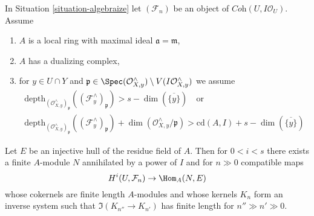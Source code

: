 \begin{lemma}
\label{lemma-helper-algebraize}
In Situation \ref{situation-algebraize} let $(\mathcal{F}_n)$
be an object of $\textit{Coh}(U, I\mathcal{O}_U)$. Assume
\begin{enumerate}
\item $A$ is a local ring with maximal ideal $\mathfrak a = \mathfrak m$,
\item $A$ has a dualizing complex,
\item for $y \in U \cap Y$ and
$\mathfrak p \in \Spec(\mathcal{O}_{X, y}^\wedge)
\setminus V(I\mathcal{O}_{X, y}^\wedge)$ we assume
$$
\begin{matrix}
\text{depth}_{(\mathcal{O}_{X, y}^\wedge)_\mathfrak p}(
(\mathcal{F}_y^\wedge)_\mathfrak p) >
s - \dim(\overline{\{y\}}) \quad\text{or}\\
\text{depth}_{(\mathcal{O}_{X, y}^\wedge)_\mathfrak p}(
(\mathcal{F}_y^\wedge)_\mathfrak p) +
\dim(\mathcal{O}_{X, y}^\wedge/\mathfrak p) >
\text{cd}(A, I) + s - \dim(\overline{\{y\}})
\end{matrix}
$$
\end{enumerate}
Let $E$ be an injective hull of the residue field of $A$. Then for $0 < i < s$
there exists a finite $A$-module $N$ annihilated by a power
of $I$ and for $n \gg 0$ compatible maps
$$
H^i(U, \mathcal{F}_n) \to \Hom_A(N, E)
$$
whose cokernels are finite length $A$-modules and whose kernels $K_n$
form an inverse system such that $\Im(K_{n''} \to K_{n'})$ has finite
length for $n'' \gg n' \gg 0$.
\end{lemma}

